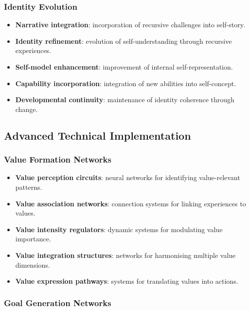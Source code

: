 \documentclass[12pt]{article}
\begin{document}
\subsubsection{Identity Evolution}

\begin{itemize}
\item \textbf{Narrative integration}: incorporation of recursive challenges into self-story.
\item \textbf{Identity refinement}: evolution of self-understanding through recursive experiences.
\item \textbf{Self-model enhancement}: improvement of internal self-representation.
\item \textbf{Capability incorporation}: integration of new abilities into self-concept.
\item \textbf{Developmental continuity}: maintenance of identity coherence through change.
\end{itemize}

\subsection{Advanced Technical Implementation}

\subsubsection{Value Formation Networks}

\begin{itemize}
\item \textbf{Value perception circuits}: neural networks for identifying value-relevant patterns.
\item \textbf{Value association networks}: connection systems for linking experiences to values.
\item \textbf{Value intensity regulators}: dynamic systems for modulating value importance.
\item \textbf{Value integration structures}: networks for harmonising multiple value dimensions.
\item \textbf{Value expression pathways}: systems for translating values into actions.
\end{itemize}

\subsubsection{Goal Generation Networks}
\end{document}
